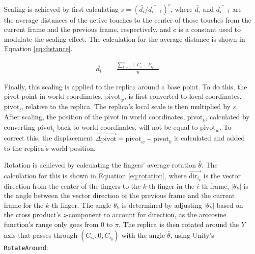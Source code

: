     Scaling is achieved by first calculating $s = {{\left(\bar{d_i} / \bar{d_{i-1}}\right)}^{c}}$, where \(\bar{d_i}\) and \(\bar{d_{i-1}}\) are the average distances of the active touches to the center of those touches from the current frame and the previous frame, respectively, and \(c\) is a constant used to modulate the scaling effect. The calculation for the average distance is shown in Equation \ref{eq:distance}.
    
    \begin{figure}[h]
    \begin{equation}
    \begin{split} \label{eq:distance}
        \bar{d_i} &= \frac{\sum_{k = 1}^{n} \| C_i - F_{i_k} \|}{n}
    \end{split}
    \end{equation}
    \end{figure}
    
    Finally, this scaling is applied to the replica around a base point. To do this, the pivot point in world coordinates, \(\mathrm{pivot}_w\), is first converted to local coordinates, \(\mathrm{pivot}_l\), relative to the replica. The replica's local scale is then multiplied by \(s\). After scaling, the position of the pivot in world coordinates, \(\mathrm{pivot}_k\), calculated by converting \(\mathrm{pivot}_l\) back to world coordinates, will not be equal to \(\mathrm{pivot}_w\). To correct this, the displacement \(\vec{\Delta \mathrm{pivot}} = \mathrm{pivot}_w - \mathrm{pivot}_k\) is calculated and added to the replica's world position.

    Rotation is achieved by calculating the fingers' average rotation \(\bar{\theta}\). The calculation for this is shown in Equation \ref{eq:rotation}, where \(\vec{\mathrm{dir}_{i_k}}\) is the vector direction from the center of the fingers to the \(k\)-th finger in the \(i\)-th frame, \(|\theta_k|\) is the angle between the vector direction of the previous frame and the current frame for the \(k\)-th finger. The angle \(\theta_k\) is determined by adjusting \(|\theta_k|\) based on the cross product's \(z\)-component to account for direction, as the arccosine function's range only goes from \(0\) to \(\pi\). The replica is then rotated around the \(Y\) axis that passes through \((C_{i_x}, 0, C_{i_y})\) with the angle $\bar{\theta}$, using Unity's \lstinline{RotateAround}.

